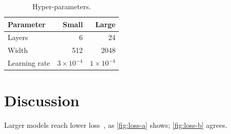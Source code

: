 \documentclass[10pt,twocolumn]{article}
\begin{document}
\begin{table}[t]
\centering
\caption{Hyper-parameters.}\label{tab:hp}
\begin{tabular}{lrr}
\toprule
Parameter & Small & Large \\
\midrule
Layers & 6 & 24 \\
Width & 512 & 2048 \\
Learning rate & $3\times10^{-4}$ & $1\times10^{-4}$ \\
\bottomrule
\end{tabular}
\end{table}

\section{Discussion}
Larger models reach lower loss~\cite{lamport1994}, as \cref{fig:loss-a}
shows; \cref{fig:loss-b} agrees.



\end{document}
